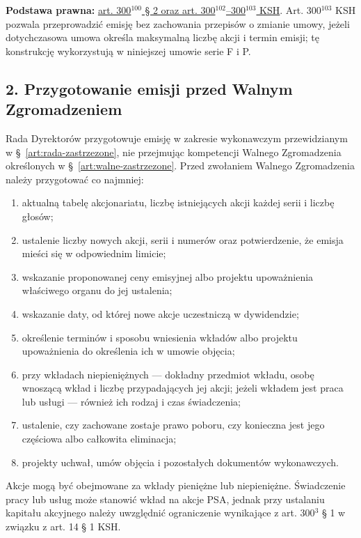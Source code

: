 \documentclass[12pt,a4paper]{report}
\begin{document}
\textbf{Podstawa prawna:} \href{https://eli.gov.pl/api/acts/DU/2024/18/text.html}{art. 300$^{100}$ § 2 oraz art. 300$^{102}$--300$^{103}$ KSH}. Art. 300$^{103}$ KSH pozwala przeprowadzić emisję bez zachowania przepisów o zmianie umowy, jeżeli dotychczasowa umowa określa maksymalną liczbę akcji i termin emisji; tę konstrukcję wykorzystują w niniejszej umowie serie F i P.

\subsection*{2. Przygotowanie emisji przed Walnym Zgromadzeniem}

Rada Dyrektorów przygotowuje emisję w zakresie wykonawczym przewidzianym w §~\ref{art:rada-zastrzezone}, nie przejmując kompetencji Walnego Zgromadzenia określonych w §~\ref{art:walne-zastrzezone}. Przed zwołaniem Walnego Zgromadzenia należy przygotować co najmniej:
\begin{enumerate}
  \item aktualną tabelę akcjonariatu, liczbę istniejących akcji każdej serii i liczbę głosów;
  \item ustalenie liczby nowych akcji, serii i numerów oraz potwierdzenie, że emisja mieści się w odpowiednim limicie;
  \item wskazanie proponowanej ceny emisyjnej albo projektu upoważnienia właściwego organu do jej ustalenia;
  \item wskazanie daty, od której nowe akcje uczestniczą w dywidendzie;
  \item określenie terminów i sposobu wniesienia wkładów albo projektu upoważnienia do określenia ich w umowie objęcia;
  \item przy wkładach niepieniężnych --- dokładny przedmiot wkładu, osobę wnoszącą wkład i liczbę przypadających jej akcji; jeżeli wkładem jest praca lub usługi --- również ich rodzaj i czas świadczenia;
  \item ustalenie, czy zachowane zostaje prawo poboru, czy konieczna jest jego częściowa albo całkowita eliminacja;
  \item projekty uchwał, umów objęcia i pozostałych dokumentów wykonawczych.
\end{enumerate}

Akcje mogą być obejmowane za wkłady pieniężne lub niepieniężne. Świadczenie pracy lub usług może stanowić wkład na akcje PSA, jednak przy ustalaniu kapitału akcyjnego należy uwzględnić ograniczenie wynikające z art. 300$^{3}$ § 1 w związku z art. 14 § 1 KSH.
\end{document}
